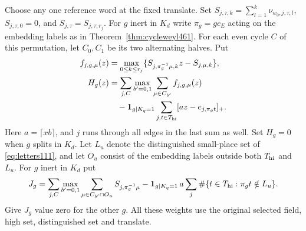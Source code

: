 \documentclass[a4paper,11pt]{article}
\theoremstyle{definition}
\theoremstyle{remark}
\numberwithin{equation}{section}
\begin{document}
Choose any one reference word at the fixed translate. Set
\(S_{j,\tau,k}=\sum_{l=1}^k\nu_{w_0,j,\tau,l}\),
\(S_{j,\tau,0}=0\), and \(S_{j,\tau}=S_{j,\tau,r_j}\).
For \(g\) inert in \(K_d\) write \(\pi_g=g c_E\) acting on
the embedding labels as in Theorem~\ref{thm:cycleweyl461}.
For each even cycle \(C\) of this permutation, let \(C_0,C_1\)
be its two alternating halves. Put
\[
 \begin{aligned}
 f_{j,g,\mu}(z)
   &=\max_{0\le k\le r_j}
             \{S_{j,\pi_g^{-1}\mu,k}z-S_{j,\mu,k}\},\\
 H_g(z)
   &=\sum_{j,C}\max_{b'=0,1}\sum_{\mu\in C_{b'}}
                                       f_{j,g,\mu}(z)\\
   &\quad-{\bf1}_{g|K_q=1}
        \sum_{j,t\in T_{\rm hi}}[a z-e_{j,\pi_g t}]_+ .
 \end{aligned}
\]
Here \(a=\lceil xb\rceil\), and \(j\) runs through all edges in
the last sum as well. Set \(H_g=0\) when \(g\) splits in \(K_d\).
Let \(L_u\) denote the distinguished small-place set of
\eqref{eq:letters111}, and let \(O_u\) consist of the embedding
labels outside both \(T_{\rm hi}\) and \(L_u\). For \(g\) inert
in \(K_d\) put
\[
 J_g=\sum_{j,C}\max_{b'=0,1}
           \sum_{\mu\in C_{b'}\cap O_u} S_{j,\pi_g^{-1}\mu}
       -{\bf1}_{g|K_q=1}\,a
           \sum_j\#\{t\in T_{\rm hi}:\pi_g t\notin L_u\} .
\]
Give \(J_g\) value zero for the other \(g\). All these weights use
the original selected field, high set, distinguished set and
translate.
\end{document}
